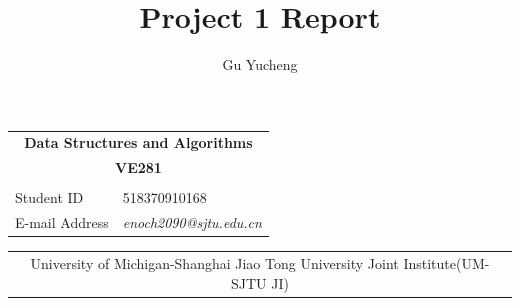 \documentclass[a4paper]{article}
\begin{document}
\title{\textbf{Project 1 Report}}
\author{Gu Yucheng}
\maketitle
\begin{table}[ht]
\centering
\begin{tabular}{ll}
\multicolumn{2}{c}{\textbf{Data Structures and Algorithms}}        \\
\multicolumn{2}{c}{\textbf{VE281}}                                 \\
\multicolumn{2}{l}{}                                               \\
Student ID     & 518370910168                                      \\
E-mail Address & \textit{enoch2090@sjtu.edu.cn}
\end{tabular}
\end{table}

\begin{table}[b]
\centering
\begin{tabular}{c}
University of Michigan-Shanghai Jiao Tong University Joint Institute(UM-SJTU JI)\\
\end{tabular}
\end{table}

\thispagestyle{empty}
\newpage
\setcounter{page}{1}
\end{document}
